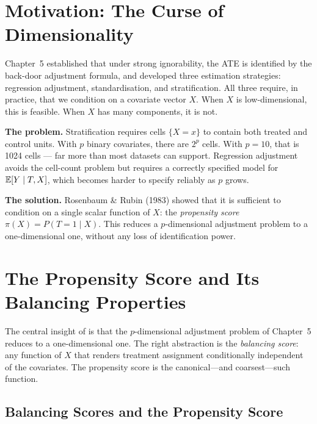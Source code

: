 \documentclass[master.tex]{subfiles}
\begin{document}
\section{Motivation: The Curse of Dimensionality}

Chapter~5 established that under strong ignorability, the ATE is
identified by the back-door adjustment formula, and developed three
estimation strategies: regression adjustment, standardisation, and
stratification.  All three require, in practice, that we condition on a
covariate vector $X$.  When $X$ is low-dimensional, this is feasible.
When $X$ has many components, it is not.

\medskip\noindent\textbf{The problem.}  Stratification requires cells
$\{X = x\}$ to contain both treated and control units.  With $p$ binary
covariates, there are $2^p$ cells.  With $p = 10$, that is 1024 cells
--- far more than most datasets can support.  Regression adjustment
avoids the cell-count problem but requires a correctly specified model
for $\mathbb{E}[Y \mid T, X]$, which becomes harder to specify reliably as $p$
grows.

\medskip\noindent\textbf{The solution.}  Rosenbaum \& Rubin (1983)
showed that it is sufficient to condition on a single scalar function
of $X$: the \emph{propensity score} $\pi(X) = P(T{=}1 \mid X)$.  This
reduces a $p$-dimensional adjustment problem to a one-dimensional one,
without any loss of identification power.

\section{The Propensity Score and Its Balancing Properties}

The central insight of \citet{rosenbaum1983central} is that the
$p$-dimensional adjustment problem of Chapter~5 reduces to a
one-dimensional one.  The right abstraction is the
\emph{balancing score}: any function of $X$ that renders treatment
assignment conditionally independent of the covariates.  The
propensity score is the canonical---and coarsest---such function.

\subsection{Balancing Scores and the Propensity Score}
\end{document}
